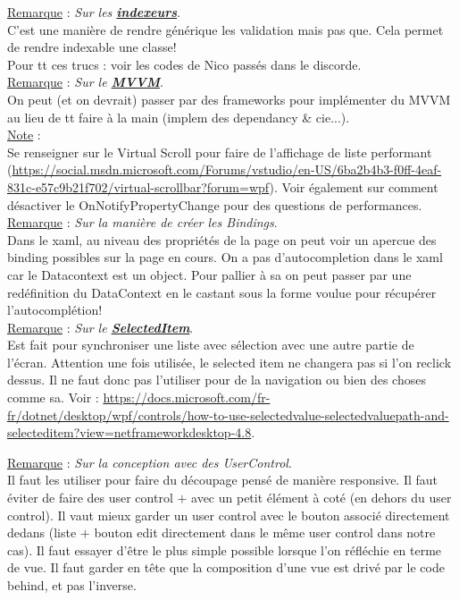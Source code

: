 \documentclass[a4paper,12pt,twoside]{article}
\newcommand{\urlcolor}{magenta}  %
\newcommand{\keycolor}{purple} %
\newcommand{\incode}[1]{{\footnotesize\ttfamily #1}} %
\newcommand{\rem}[2]{\noindent\underline{Remarque} : \textit{#1}.\\ \indent #2}
\newcommand{\note}[1]{\noindent\underline{Note} : \\ \indent #1}
\newcommand{\keyref}[2]{\hypersetup{urlcolor=\keycolor} \href{#1}{\textbf{#2}}\hypersetup{urlcolor=\urlcolor}}
\begin{document}
\rem{Sur les \keyref{https://docs.microsoft.com/fr-fr/dotnet/csharp/programming-guide/indexers/}{indexeurs}}{C'est une manière de rendre générique les validation mais pas que. Cela permet de rendre indexable une classe!}\\

Pour tt ces trucs : voir les codes de Nico passés dans le discorde.\\

\rem{Sur le \keyref{https://docs.microsoft.com/en-us/windows/communitytoolkit/mvvm/introduction}{MVVM}}{On peut (et on devrait) passer par des frameworks pour implémenter du MVVM au lieu de tt faire à la main (implem des dependancy & cie...).}\\

\note{Se renseigner sur le Virtual Scroll pour faire de l'affichage de liste performant (\url{https://social.msdn.microsoft.com/Forums/vstudio/en-US/6ba2b4b3-f0ff-4eaf-831c-e57c9b21f702/virtual-scrollbar?forum=wpf}). Voir également sur comment désactiver le OnNotifyPropertyChange pour des questions de performances.}\\

\rem{Sur la manière de créer les Bindings}{Dans le xaml, au niveau des propriétés de la page on peut voir un apercue des binding possibles sur la page en cours. On a pas d'autocompletion dans le xaml car le Datacontext est un \incode{object}. Pour pallier à sa on peut passer par une redéfinition du DataContext en le castant sous la forme voulue pour récupérer l'autocomplétion!}\\

\rem{Sur le \keyref{https://docs.microsoft.com/fr-fr/dotnet/api/system.windows.controls.treeview.selecteditem?view=windowsdesktop-6.0}{SelectedItem}}{Est fait pour synchroniser une liste avec sélection avec une autre partie de l'écran. Attention une fois utilisée, le selected item ne changera pas si l'on reclick dessus. Il ne faut donc pas l'utiliser pour de la navigation ou bien des choses comme sa. Voir : \url{https://docs.microsoft.com/fr-fr/dotnet/desktop/wpf/controls/how-to-use-selectedvalue-selectedvaluepath-and-selecteditem?view=netframeworkdesktop-4.8}.}

\rem{Sur la conception avec des UserControl}{Il faut les utiliser pour faire du découpage pensé de manière responsive. Il faut éviter de faire des user control $+$ avec un petit élément à coté (en dehors du user control). Il vaut mieux garder un user control avec le bouton associé directement dedans (liste $+$ bouton edit directement dans le même user control dans notre cas). Il faut essayer d'être le plus simple possible lorsque l'on réfléchie en terme de vue. Il faut garder en tête que la composition d'une vue est drivé par le code behind, et pas l'inverse.}\\
\end{document}
